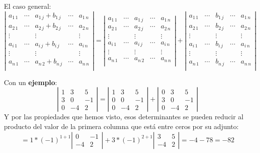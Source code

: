 \documentclass[a4paper,11pt,answers]{exam}
\begin{document}
El caso general:
\[\left|\begin{array}{ccccc}
a_{1\,1}&\cdots&a_{1\,j} + b_{1\,j}&\cdots&a_{1\,n}\\
a_{2\,1}&\cdots&a_{2\,j} + b_{2\,j}&\cdots&a_{2\,n}\\
\vdots&&\vdots&&\vdots\\
a_{i\,1}&\cdots&a_{i\,j} + b_{i\,j}&\cdots&a_{i\,n}\\
\vdots&&\vdots&&\vdots\\
a_{n\,1}&\cdots&a_{n\,2}+b_{n\,j}&\cdots&a_{n\,n}\\
\end{array}\right| = \left|\begin{array}{ccccc}
a_{1\,1}&\cdots&a_{1\,j}&\cdots&a_{1\,n}\\
a_{2\,1}&\cdots&a_{2\,j}&\cdots&a_{2\,n}\\
\vdots&&\vdots&&\vdots\\
a_{i\,1}&\cdots&a_{i\,j}&\cdots&a_{i\,n}\\
\vdots&&\vdots&&\vdots\\
a_{n\,1}&\cdots&a_{n\,2}&\cdots&a_{n\,n}\\
\end{array}\right| + \left|\begin{array}{ccccc}
a_{1\,1}&\cdots&b_{1\,j}&\cdots&a_{1\,n}\\
a_{2\,1}&\cdots&b_{2\,j}&\cdots&a_{2\,n}\\
\vdots&&\vdots&&\vdots\\
a_{i\,1}&\cdots&b_{i\,j}&\cdots&a_{i\,n}\\
\vdots&&\vdots&&\vdots\\
a_{n\,1}&\cdots&b_{n\,j}&\cdots&a_{n\,n}\\
\end{array}\right| \]

Con un \textbf{ejemplo}:
\[\left|\begin{array}{rrr}
1&3&5\\
3&0&-1\\
0&-4&2
\end{array}\right| = \left|\begin{array}{rrr}
1&3&5\\
0&0&-1\\
0&-4&2
\end{array}\right| + \left|\begin{array}{rrr}
0&3&5\\
3&0&-1\\
0&-4&2
\end{array}\right|\]
Y por las propiedades que hemos visto, esos determinantes se pueden reducir al producto del valor de la primera columna que está entre ceros por su adjunto:
\[=1*(-1)^{1+1}\left|\begin{array}{rr}
0&-1\\
-4&2
\end{array}\right| + 3*(-1)^{2+1}\left|\begin{array}{rr}
3&5\\
-4&2
\end{array}\right| = -4 -78 = -82\]
\end{document}
